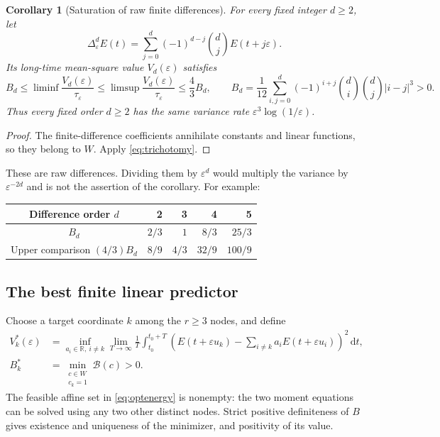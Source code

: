 \documentclass[11pt]{article}
\newtheorem{corollary}[theorem]{Corollary}
\theoremstyle{definition}\newtheorem{definition}[theorem]{Definition}
\theoremstyle{remark}\newtheorem{remark}[theorem]{Remark}
\newcommand{\R}{\mathbb R}
\newcommand{\dd}{\,\mathrm d}
\newcommand{\eps}{\varepsilon}
\newcommand{\tauE}{\tau_\eps}
\newcommand{\bB}{\mathcal B}
\begin{document}
\begin{corollary}[Saturation of raw finite differences]\label{cor:diff}
For every fixed integer $d\ge2$, let
\[
 \Delta_\eps^d E(t)=\sum_{j=0}^d(-1)^{d-j}\binom dj E(t+j\eps).
\]
Its long-time mean-square value $V_d(\eps)$ satisfies
\begin{equation}\label{eq:diff}
 B_d\le\liminf\frac{V_d(\eps)}{\tauE}
 \le\limsup\frac{V_d(\eps)}{\tauE}\le\frac43 B_d,
 \qquad
 B_d=\frac1{12}\sum_{i,j=0}^d
          (-1)^{i+j}\binom di\binom dj|i-j|^3>0.
\end{equation}
Thus every fixed order $d\ge2$ has the same variance rate
$\eps^3\log(1/\eps)$.
\end{corollary}
\begin{proof}
The finite-difference coefficients annihilate constants and linear
functions, so they belong to $W$. Apply \eqref{eq:trichotomy}.
\end{proof}
These are raw differences. Dividing them by $\eps^d$ would multiply the
variance by $\eps^{-2d}$ and is not the assertion of the corollary.
For example:
\begin{center}
\begin{tabular}{@{}crrrr@{}}
\toprule
Difference order $d$&2&3&4&5\\
\midrule
$B_d$&$2/3$&$1$&$8/3$&$25/3$\\
Upper comparison $(4/3)B_d$&$8/9$&$4/3$&$32/9$&$100/9$\\
\bottomrule
\end{tabular}
\end{center}

\subsection{The best finite linear predictor}
Choose a target coordinate $k$ among the $r\ge3$ nodes, and define
\begin{align}
 V_k^*(\eps)&=\inf_{a_i\in\R,\ i\ne k}
 \lim_{T\to\infty}\frac1T\int_{t_0}^{t_0+T}
 \left(E(t+\eps u_k)-\sum_{i\ne k}a_iE(t+\eps u_i)\right)^2\dd t,
 \label{eq:predict}\\
 B_k^*&=\min_{\substack{c\in W\\c_k=1}}\bB(c)>0.
 \label{eq:optenergy}
\end{align}
The feasible affine set in \eqref{eq:optenergy} is nonempty: the two
moment equations can be solved using any two other distinct nodes.
Strict positive definiteness of $B$ gives existence and uniqueness of
the minimizer, and positivity of its value.
\end{document}
